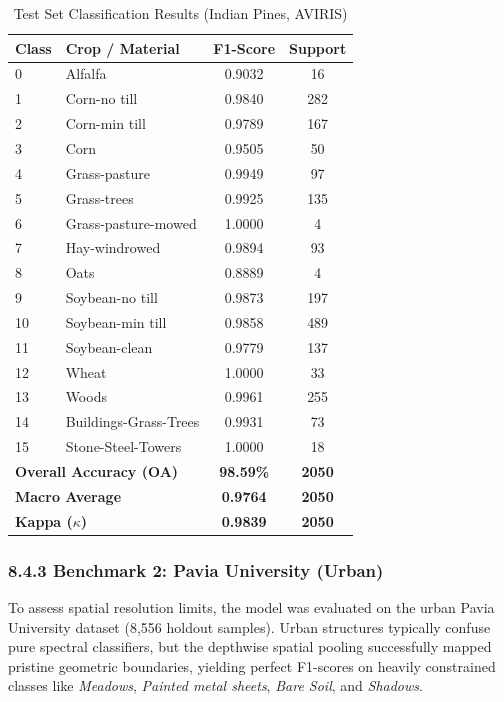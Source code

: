 \documentclass[11pt, letterpaper]{article}
\begin{document}
\begin{table}[H]
\centering
\footnotesize
\caption{Test Set Classification Results (Indian Pines, AVIRIS)}
\label{tab:hsi_ip}
\renewcommand{\arraystretch}{1.2}
\sffamily
\begin{tabular}{@{}llcc@{}}
\toprule
\textbf{Class} & \textbf{Crop / Material} & \textbf{F1-Score} & \textbf{Support} \\ \midrule
0 & Alfalfa & 0.9032 & 16 \\
1 & Corn-no till & 0.9840 & 282 \\
2 & Corn-min till & 0.9789 & 167 \\
3 & Corn & 0.9505 & 50 \\
4 & Grass-pasture & 0.9949 & 97 \\
5 & Grass-trees & 0.9925 & 135 \\
6 & Grass-pasture-mowed & 1.0000 & 4 \\
7 & Hay-windrowed & 0.9894 & 93 \\
8 & Oats & 0.8889 & 4 \\
9 & Soybean-no till & 0.9873 & 197 \\
10 & Soybean-min till & 0.9858 & 489 \\
11 & Soybean-clean & 0.9779 & 137 \\
12 & Wheat & 1.0000 & 33 \\
13 & Woods & 0.9961 & 255 \\
14 & Buildings-Grass-Trees & 0.9931 & 73 \\
15 & Stone-Steel-Towers & 1.0000 & 18 \\ \midrule
\multicolumn{2}{l}{\textbf{Overall Accuracy (OA)}} & \textbf{98.59\%} & \textbf{2050} \\
\multicolumn{2}{l}{\textbf{Macro Average}} & \textbf{0.9764} & \textbf{2050} \\
\multicolumn{2}{l}{\textbf{Kappa ($\kappa$)}} & \textbf{0.9839} & \textbf{2050} \\ \bottomrule
\end{tabular}
\end{table}

\subsubsection{8.4.3 Benchmark 2: Pavia University (Urban)}
To assess spatial resolution limits, the model was evaluated on the urban Pavia University dataset (8,556 holdout samples). Urban structures typically confuse pure spectral classifiers, but the depthwise spatial pooling successfully mapped pristine geometric boundaries, yielding perfect F1-scores on heavily constrained classes like \textit{Meadows}, \textit{Painted metal sheets}, \textit{Bare Soil}, and \textit{Shadows}.
\end{document}
